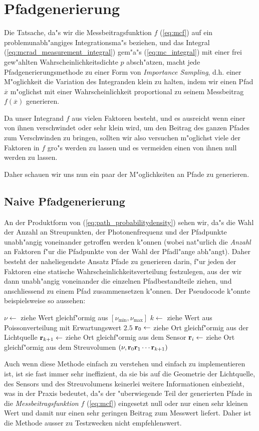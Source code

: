 	\section{Pfadgenerierung}
	Die Tatsache, da"s wir die Messbeitragsfunktion $f$ (\ref{eq:mcf}) auf ein problemunabh"angiges Integrationsma"s beziehen, und das Integral (\ref{eq:mcrad_measurement_integral}) gem"a"s (\ref{eq:mc_integral}) mit einer frei gew"ahlten Wahrscheinlichkeitsdichte $p$ absch"atzen, macht jede Pfadgenerierungsmethode zu einer Form von {\em Importance Sampling}, d.h. einer M"oglichkeit die Variation des Integranden klein zu halten, indem wir einen Pfad ${\overline x}$ m"oglichst mit einer Wahrscheinlichkeit proportional zu seinem Messbeitrag $f({\overline x})$ generieren.
	
	Da unser Integrand $f$ aus vielen Faktoren besteht, und es ausreicht wenn einer von ihnen verschwindet oder sehr klein wird, um den Beitrag des ganzen Pfades zum Verschwinden zu bringen, sollten wir also versuchen m"oglichst viele der Faktoren in $f$ gro"s werden zu lassen und es vermeiden einen von ihnen null werden zu lassen.
	
	Daher schauen wir uns nun ein paar der M"oglichkeiten an Pfade zu generieren.
	\subsection{Naive Pfadgenerierung}
	An der Produktform von (\ref{eq:path_probabilitydensity}) sehen wir, da"s die Wahl der Anzahl an Streupunkten, der Photonenfrequenz und der Pfadpunkte unabh"angig voneinander getroffen werden k"onnen (wobei nat"urlich die {\em Anzahl} an Faktoren f"ur die Pfadpunkte von der Wahl der Pfadl"ange abh"angt). Daher besteht der naheliegendste Ansatz Pfade zu generieren darin, f"ur jeden der Faktoren eine statische Wahrscheinlichkeitsverteilung festzulegen, aus der wir dann unabh"angig voneinander die einzelnen Pfadbestandteile ziehen, und anschliessend zu einem Pfad zusammensetzen k"onnen. Der Pseudocode k"onnte beispielsweise so aussehen:
	\begin{algorithmic}
		\STATE $\nu \leftarrow$ ziehe Wert gleichf"ormig aus $[\nu_\text{min},\nu_\text{max}]$
		\STATE $k \leftarrow$ ziehe Wert aus Poissonverteilung mit Erwartungswert $2.5$
		\STATE $\mathbf{r}_0 \leftarrow$ ziehe Ort gleichf"ormig aus der Lichtquelle
		\STATE $\mathbf{r}_{k+1} \leftarrow$ ziehe Ort gleichf"ormig aus dem Sensor
			\STATE $\mathbf{r}_i \leftarrow$ ziehe Ort gleichf"ormig aus dem Streuvolumen
	  \ENDFOR
	  \RETURN $(\nu,\mathbf{r}_0\mathbf{r}_1\cdots\mathbf{r}_{k+1})$
	\end{algorithmic}
	Auch wenn diese Methode einfach zu verstehen und einfach zu implementieren ist, ist sie fast immer sehr ineffizient, da sie bis auf die Geometrie der Lichtquelle, des Sensors und des Streuvolumens keinerlei weitere Informationen einbezieht, was in der Praxis bedeutet, da"s der "uberwiegende Teil der generierten Pfade in die {\em Messbeitragsfunktion} $f$ (\ref{eq:mcf}) eingesetzt null oder nur einen sehr kleinen Wert und damit nur einen sehr geringen Beitrag zum Messwert liefert. Daher ist die Methode ausser zu Testzwecken nicht empfehlenswert.
	

